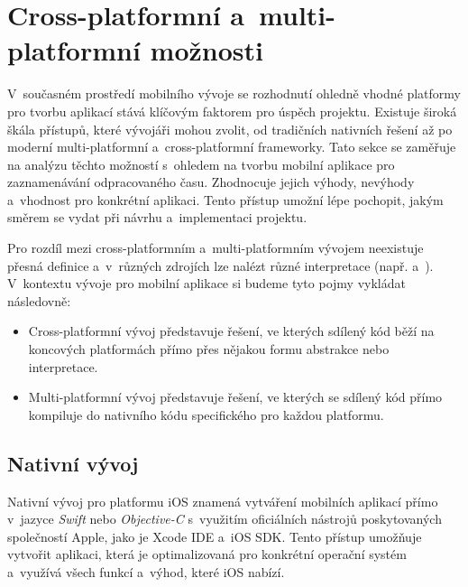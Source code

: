 \section{Cross-platformní a~multi-platformní možnosti}\label{crossplatform-multiplatform}

V~současném prostředí mobilního vývoje se rozhodnutí ohledně vhodné platformy pro tvorbu aplikací stává klíčovým faktorem pro úspěch projektu. Existuje široká škála přístupů, které vývojáři mohou zvolit, od tradičních nativních řešení až po moderní multi-platformní a~cross-platformní frameworky. Tato sekce se zaměřuje na analýzu těchto možností s~ohledem na tvorbu mobilní aplikace pro zaznamenávání odpracovaného času. Zhodnocuje jejich výhody, nevýhody a~vhodnost pro konkrétní aplikaci. Tento přístup umožní lépe pochopit, jakým směrem se vydat při návrhu a~implementaci projektu.

Pro rozdíl mezi cross-platformním a~multi-platformním vývojem neexistuje přesná definice a~v~různých zdrojích lze nalézt různé interpretace (např. \cite{cross-multiplatform-alternative-intepretation-one} a~\cite{cross-multiplatform-alternative-intepretation-two}). V~kontextu vývoje pro mobilní aplikace si budeme tyto pojmy vykládat následovně:
\begin{itemize}
\item Cross-platformní vývoj představuje řešení, ve kterých sdílený kód běží na koncových platformách přímo přes nějakou formu abstrakce nebo interpretace.
\item Multi-platformní vývoj představuje řešení, ve kterých se sdílený kód přímo kompiluje do nativního kódu specifického pro každou platformu.
\end{itemize}

\subsection{Nativní vývoj}

Nativní vývoj pro platformu iOS znamená vytváření mobilních aplikací přímo v~jazyce \emph{Swift} nebo \emph{Objective-C} s~využitím oficiálních nástrojů poskytovaných společností Apple, jako je Xcode IDE a~iOS SDK. Tento přístup umožňuje vytvořit aplikaci, která je optimalizovaná pro konkrétní operační systém a~využívá všech funkcí a~výhod, které iOS nabízí.

